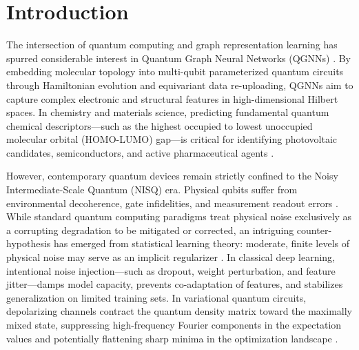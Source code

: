 \documentclass[sn-apacite,Numbered]{sn-jnl}
\begin{document}

\maketitle

\section{Introduction}\label{sec:introduction}

The intersection of quantum computing and graph representation learning has spurred considerable interest in Quantum Graph Neural Networks (QGNNs) \cite{beer2020training,deocarizborde2022graph}. By embedding molecular topology into multi-qubit parameterized quantum circuits through Hamiltonian evolution and equivariant data re-uploading, QGNNs aim to capture complex electronic and structural features in high-dimensional Hilbert spaces. In chemistry and materials science, predicting fundamental quantum chemical descriptors—such as the highest occupied to lowest unoccupied molecular orbital (HOMO-LUMO) gap—is critical for identifying photovoltaic candidates, semiconductors, and active pharmaceutical agents \cite{ramakrishnan2014quantum,liu2021transferable}.

However, contemporary quantum devices remain strictly confined to the Noisy Intermediate-Scale Quantum (NISQ) era. Physical qubits suffer from environmental decoherence, gate infidelities, and measurement readout errors \cite{mcclean2018barren,wang2021noise}. While standard quantum computing paradigms treat physical noise exclusively as a corrupting degradation to be mitigated or corrected, an intriguing counter-hypothesis has emerged from statistical learning theory: moderate, finite levels of physical noise may serve as an implicit regularizer \cite{du2021quantum,zhang2026theory}. In classical deep learning, intentional noise injection—such as dropout, weight perturbation, and feature jitter—damps model capacity, prevents co-adaptation of features, and stabilizes generalization on limited training sets. In variational quantum circuits, depolarizing channels contract the quantum density matrix toward the maximally mixed state, suppressing high-frequency Fourier components in the expectation values and potentially flattening sharp minima in the optimization landscape \cite{gilfuster2024understanding,hur2024understanding}.
\end{document}
